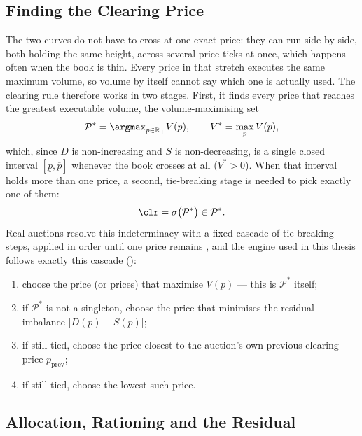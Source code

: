 \subsection{Finding the Clearing Price}

The two curves do not have to cross at one exact price: they can run side
by side, both holding the same height, across several price ticks at
once, which happens often when the book is thin. Every price in that
stretch executes the same maximum volume, so volume by itself cannot say
which one is actually used. The clearing rule therefore works in two
stages. First, it finds every price that reaches the greatest executable
volume, the volume-maximising set
\begin{equation}
  \mathcal{P}^{*} = \argmax_{p \in \mathbb{R}_{+}} V(p),
  \qquad V^{*} = \max_{p} V(p),
\end{equation}
which, since $D$ is non-increasing and $S$ is non-decreasing, is a single
closed interval $[\underline{p}, \overline{p}]$ whenever the book crosses
at all ($V^{*} > 0$). When that interval holds more than one price, a
second, tie-breaking stage is needed to pick exactly one of them:
\begin{equation}
  \label{eq:clearing}
  \clr = \sigma\bigl(\mathcal{P}^{*}\bigr) \in \mathcal{P}^{*}.
\end{equation}
Real auctions resolve this indeterminacy with a fixed cascade of
tie-breaking steps, applied in order until one price remains
\citep{haynes2020precedence}, and the engine used in this thesis follows
exactly this cascade ():
\begin{enumerate}
  \item choose the price (or prices) that maximise $V(p)$ --- this is
  $\mathcal{P}^{*}$ itself;
  \item if $\mathcal{P}^{*}$ is not a singleton, choose the price that
  minimises the residual imbalance $|D(p) - S(p)|$;
  \item if still tied, choose the price closest to the auction's own
  previous clearing price $p_{\mathrm{prev}}$;
  \item if still tied, choose the lowest such price.
\end{enumerate}

\subsection{Allocation, Rationing and the Residual}

